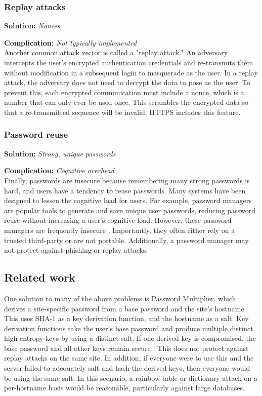 \subsubsection{Replay attacks}

\textbf{Solution:} \emph{Nonces}

\noindent\textbf{Complication:} \emph{Not typically implemented}\\

\noindent Another common attack vector is called a "replay attack." An adversary intercepts the user's encrypted authentication credentials and re-transmits them without modification in a subsequent login to masquerade as the user. In a replay attack, the adversary does not need to decrypt the data to pose as the user. To prevent this, each encrypted communication must include a nonce, which is a number that can only ever be used once. This scrambles the encrypted data so that a re-transmitted sequence will be invalid. HTTPS includes this feature.


\subsubsection{Password reuse}

\textbf{Solution:} \emph{Strong, unique passwords}

\noindent\textbf{Complication:} \emph{Cognitive overhead}\\

\noindent Finally, passwords are insecure because remembering many strong passwords is hard, and users have a tendency to reuse passwords. Many systems have been designed to lessen the cognitive load for users. For example, password managers are popular tools to generate and save unique user passwords, reducing password reuse without increasing a user's cognitive load. However, these password managers are frequently insecure \cite{Li:2014}. Importantly, they often either rely on a trusted third-party or are not portable. Additionally, a password manager may not protect against phishing or replay attacks.

\subsection{Related work}

\noindent One solution to many of the above problems is Password Multiplier, which derives a site-specific password from a base password and the site's hostname. This uses SHA-1 as a key derivation function, and the hostname as a salt. Key derivation functions take the user's base password and produce multiple distinct high entropy keys by using a distinct salt. If one derived key is compromised, the base password and all other keys remain secure \cite{Halderman:2005}. This does not protect against replay attacks on the same site. In addition, if everyone were to use this and the server failed to adequately salt and hash the derived keys, then everyone would be using the same salt. In this scenario, a rainbow table or dictionary attack on a per-hostname basis would be reasonable, particularly against large databases.

